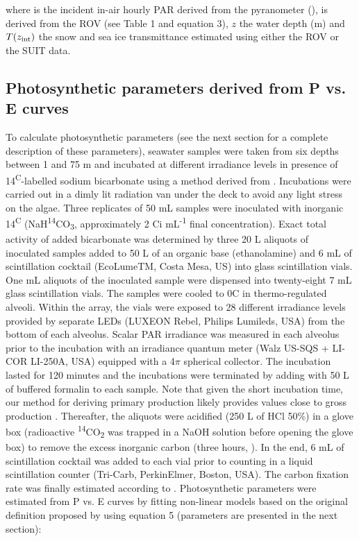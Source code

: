 \noindent where \eparzeroscalar{} is the incident in-air hourly PAR derived from the pyranometer (\micromol{}), \kdparscalar{} is derived from the ROV (see Table 1 and equation 3), $z$ the water depth (m) and $T(z_{\textnormal{int}})$ the snow and sea ice transmittance estimated using either the ROV or the SUIT data.

\subsection{Photosynthetic parameters derived from P vs. E curves}

To calculate photosynthetic parameters (see the next section for a complete description of these parameters), seawater samples were taken from six depths between 1 and 75 m and incubated at different irradiance levels in presence of 14\textsuperscript{C}-labelled sodium bicarbonate using a method derived from \citet{Lewis1983}. Incubations were carried out in a dimly lit radiation van under the deck to avoid any light stress on the algae. Three replicates of 50 mL samples were inoculated with inorganic 14\textsuperscript{C} (NaH\textsuperscript{14}CO\textsubscript{3}, approximately 2 \textmu Ci mL\textsuperscript{-1} final concentration). Exact total activity of added bicarbonate was determined by three 20 \textmu L aliquots of inoculated samples added to 50 \textmu L of an organic base (ethanolamine) and 6 mL of scintillation cocktail (EcoLumeTM, Costa Mesa, US) into glass scintillation vials. One mL aliquots of the inoculated sample were dispensed into twenty-eight 7 mL glass scintillation vials. The samples were cooled to 0\textdegree{}C in thermo-regulated alveoli. Within the array, the vials were exposed to 28 different irradiance levels provided by separate LEDs (LUXEON Rebel, Philips Lumileds, USA) from the bottom of each alveolus. Scalar PAR irradiance was measured in each alveolus prior to the incubation with an irradiance quantum meter (Walz US-SQS + LI-COR LI-250A, USA) equipped with a 4$\pi$ spherical collector. The incubation lasted for 120 minutes and the incubations were terminated by adding with 50 \textmu L of buffered formalin to each sample. Note that given the short incubation time, our method for deriving primary production likely provides values close to gross production \citep{Lewis1983}. Thereafter, the aliquots were acidified (250 \textmu L of HCl 50\%) in a glove box (radioactive \textsuperscript{14}CO\textsubscript{2} was trapped in a NaOH solution before opening the glove box) to remove the excess inorganic carbon (three hours, \citet{Knap1996}). In the end, 6 mL of scintillation cocktail was added to each vial prior to counting in a liquid scintillation counter (Tri-Carb, PerkinElmer, Boston, USA). The carbon fixation rate was finally estimated according to \citet{Parsons1984}. Photosynthetic parameters were estimated from P vs. E curves by fitting non-linear models based on the original definition proposed by \citet{Platt1980} using equation 5 (parameters are presented in the next section): 


